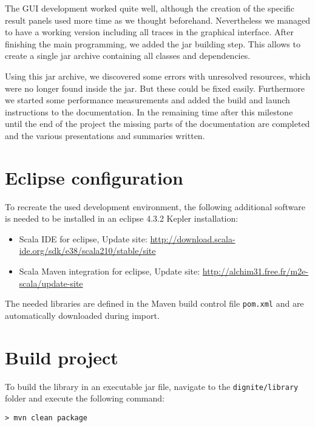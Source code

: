 \documentclass[
	a4paper,					10pt,							twoside,					openright,				notitlepage,			parskip=half,			]{scrreprt}
\begin{document}
The \gls{GUI} development worked quite well, although the creation of the specific result panels used more time as 
we thought beforehand. Nevertheless we managed to have a working version including all traces in the graphical interface.
After finishing the main programming, we added the jar building step. This allows to create a single jar archive
containing all classes and dependencies.

Using this jar archive, we discovered some errors with unresolved resources, which were no longer found inside the jar.
But these could be fixed easily. Furthermore we started some performance measurements and added the build and launch 
instructions to the documentation. In the remaining time after this milestone until the end of the project the missing
parts of the documentation are completed and the various presentations and summaries written.

\section{Eclipse configuration}
\label{sec:intro_eclipseconfig}

To recreate the used development environment, the following additional software is needed
to be installed in an eclipse 4.3.2 Kepler installation:

\begin{itemize}
\item{Scala \gls{IDE} for eclipse, Update site: \url{http://download.scala-ide.org/sdk/e38/scala210/stable/site}}
\item{Scala Maven integration for eclipse, Update site: \url{http://alchim31.free.fr/m2e-scala/update-site}}
\end{itemize}

The needed libraries are defined in the Maven build control file \verb|pom.xml| and are automatically downloaded during import.

\section{Build project}
\label{sec:intro_build}

To build the library in an executable jar file, navigate to the \verb|dignite/library| folder 
and execute the following command:

\begin{lstlisting}[language={},keywords={},identifierstyle=\ttfamily,keywordstyle=\ttfamily]
> mvn clean package
\end{lstlisting}
\end{document}
